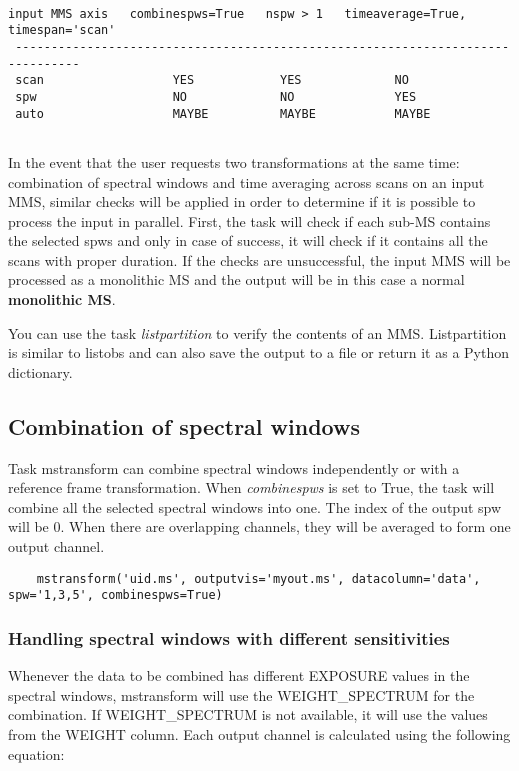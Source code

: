 \begin{verbatim}

input MMS axis   combinespws=True   nspw > 1   timeaverage=True, timespan='scan'
 -------------------------------------------------------------------------------
 scan                  YES            YES             NO        
 spw                   NO             NO              YES     
 auto                  MAYBE          MAYBE           MAYBE             
                
\end{verbatim}

In the event that the user requests two transformations at the same time: combination of
spectral windows and time averaging across scans on an input MMS, similar checks will be
applied in order to determine if it is possible to process the input in parallel. First, the task
will check if each sub-MS contains the selected spws and only in case of success, it will
check if it contains all the scans with proper duration. If the checks are unsuccessful, the input
MMS will be processed as a monolithic MS and the output will be in this case a normal
{\bf monolithic MS}.

You can use the task {\it listpartition} to verify the contents of an MMS.
Listpartition is similar to listobs and can also save the output to a file
or return it as a Python dictionary.


\subsection{Combination of spectral windows}
Task mstransform can combine spectral windows independently or
with a reference frame transformation. When {\it combinespws} is set to True, the task will
combine all the selected spectral windows into one. The index of the output spw
will be 0. When there are overlapping channels, they will be averaged to form one
output channel.

\begin{verbatim}
    mstransform('uid.ms', outputvis='myout.ms', datacolumn='data', spw='1,3,5', combinespws=True)
\end{verbatim}

\subsubsection{Handling spectral windows with different sensitivities}
Whenever the data to be combined has different EXPOSURE values in the spectral
windows, mstransform will use the WEIGHT\_SPECTRUM for the combination. If
WEIGHT\_SPECTRUM is not available, it will use the values from the WEIGHT
column. Each output channel is calculated using the following equation:

